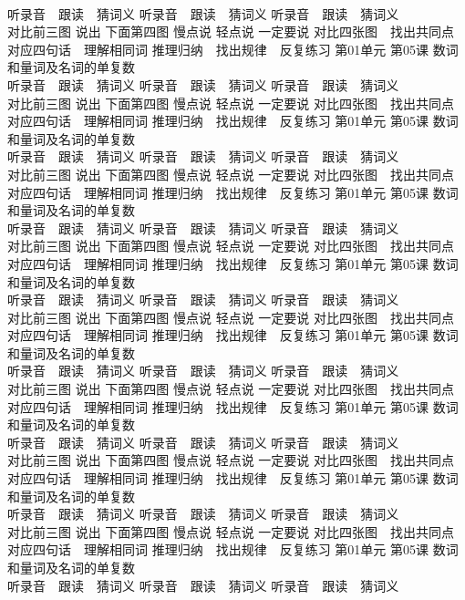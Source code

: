 \documentclass[8pt]{extreport}
\begin{document}
\begin{CJK}{UTF8}{min}
\\	听录音　跟读　猜词义 听录音　跟读　猜词义 听录音　跟读　猜词义 
\\	对比前三图 说出 下面第四图 慢点说 轻点说 一定要说	对比四张图　找出共同点 对应四句话　理解相同词 推理归纳　找出规律　反复练习 第01单元 第05课 数词和量词及名词的单复数
\\	听录音　跟读　猜词义 听录音　跟读　猜词义 听录音　跟读　猜词义 
\\	对比前三图 说出 下面第四图 慢点说 轻点说 一定要说	对比四张图　找出共同点 对应四句话　理解相同词 推理归纳　找出规律　反复练习 第01单元 第05课 数词和量词及名词的单复数
\\	听录音　跟读　猜词义 听录音　跟读　猜词义 听录音　跟读　猜词义 
\\	对比前三图 说出 下面第四图 慢点说 轻点说 一定要说	对比四张图　找出共同点 对应四句话　理解相同词 推理归纳　找出规律　反复练习 第01单元 第05课 数词和量词及名词的单复数
\\	听录音　跟读　猜词义 听录音　跟读　猜词义 听录音　跟读　猜词义 
\\	对比前三图 说出 下面第四图 慢点说 轻点说 一定要说	对比四张图　找出共同点 对应四句话　理解相同词 推理归纳　找出规律　反复练习 第01单元 第05课 数词和量词及名词的单复数
\\	听录音　跟读　猜词义 听录音　跟读　猜词义 听录音　跟读　猜词义 
\\	对比前三图 说出 下面第四图 慢点说 轻点说 一定要说	对比四张图　找出共同点 对应四句话　理解相同词 推理归纳　找出规律　反复练习 第01单元 第05课 数词和量词及名词的单复数
\\	听录音　跟读　猜词义 听录音　跟读　猜词义 听录音　跟读　猜词义 
\\	对比前三图 说出 下面第四图 慢点说 轻点说 一定要说	对比四张图　找出共同点 对应四句话　理解相同词 推理归纳　找出规律　反复练习 第01单元 第05课 数词和量词及名词的单复数
\\	听录音　跟读　猜词义 听录音　跟读　猜词义 听录音　跟读　猜词义 
\\	对比前三图 说出 下面第四图 慢点说 轻点说 一定要说	对比四张图　找出共同点 对应四句话　理解相同词 推理归纳　找出规律　反复练习 第01单元 第05课 数词和量词及名词的单复数
\\	听录音　跟读　猜词义 听录音　跟读　猜词义 听录音　跟读　猜词义 
\\	对比前三图 说出 下面第四图 慢点说 轻点说 一定要说	对比四张图　找出共同点 对应四句话　理解相同词 推理归纳　找出规律　反复练习 第01单元 第05课 数词和量词及名词的单复数
\\	听录音　跟读　猜词义 听录音　跟读　猜词义 听录音　跟读　猜词义 

\end{CJK}
\end{document}
